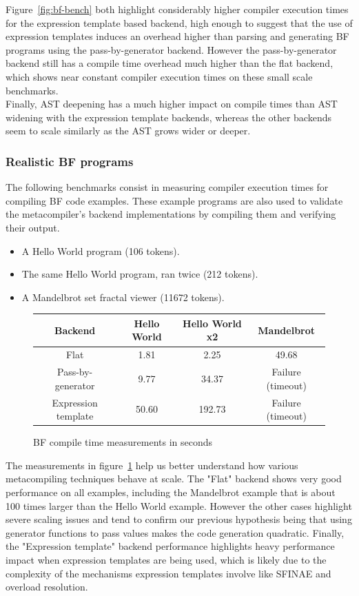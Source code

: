 \documentclass[../../main.tex]{subfiles}
\begin{document}
Figure~\ref{fig:bf-bench}
both highlight considerably higher compiler execution times for the expression
template based backend, high enough to suggest that the use of expression
templates induces an overhead higher than parsing and generating BF programs
using the pass-by-generator backend. However the pass-by-generator backend still
has a compile time overhead much higher than the flat backend, which shows near
constant compiler execution times on these small scale benchmarks.\\

Finally, AST deepening has a much higher impact on compile times than AST
widening with the expression template backends, whereas the other backends seem
to scale similarly as the AST grows wider or deeper.

\subsubsection{Realistic BF programs}

The following benchmarks consist in measuring compiler execution times for
compiling BF code examples. These example programs are also used to validate the
metacompiler's backend implementations by compiling them and verifying their
output.

\begin{itemize}
\item A Hello World program (106 tokens).
\item The same Hello World program, ran twice (212 tokens).
\item A Mandelbrot set fractal viewer (11672 tokens).
\end{itemize}

\begin{figure}[h]
\begin{tabular}{|c|c|c|c|}
\hline
Backend             & Hello World & Hello World x2  & Mandelbrot \\
\hline
Flat                & 1.81        & 2.25            & 49.68 \\
Pass-by-generator   & 9.77        & 34.37           & Failure (timeout) \\
Expression template & 50.60       & 192.73          & Failure (timeout) \\
\hline
\end{tabular}
\caption{BF compile time measurements in seconds
}\label{fig:BF-compile-times}
\end{figure}

The measurements in figure~\ref{fig:BF-compile-times} help us better understand
how various metacompiling techniques behave at scale. The "Flat" backend shows
very good performance on all examples, including the Mandelbrot example that is
about 100 times larger than the Hello World example. However the other cases
highlight severe scaling issues and tend to confirm our previous hypothesis
being that using generator functions to pass values makes the code generation
quadratic. Finally, the "Expression template" backend performance highlights
heavy performance impact when expression templates are being used, which is
likely due to the complexity of the mechanisms expression templates involve like
SFINAE and overload resolution.
\end{document}
